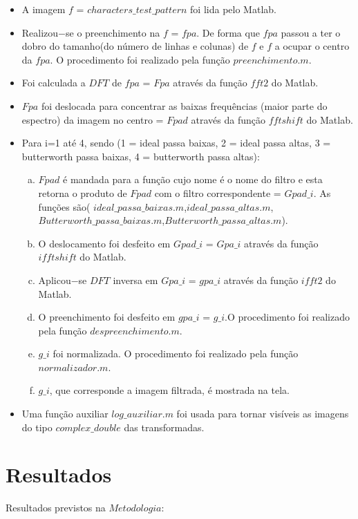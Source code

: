 \documentclass[conference]{IEEEtran}
\begin{document}
\begin{itemize}
	\item A imagem $f$ =  $characters\_test\_pattern$ foi lida pelo Matlab.
	\item Realizou$-$se o preenchimento na $f$ = $fpa$. De forma que $fpa$ passou a ter o dobro do tamanho(do n\'umero de linhas e colunas) de $f $ e $f$ a ocupar o centro da $fpa$. O procedimento foi realizado pela fun\c{c}\~ao $preenchimento.m$.
	\item Foi calculada a $DFT$ de $fpa$ = $Fpa$ atrav\'es da fun\c{c}\~ao $fft2$ do Matlab.
	\item $Fpa $ foi deslocada para concentrar as baixas frequ\^encias (maior parte do espectro) da imagem no centro = $Fpad$ atrav\'es da fun\c{c}\~ao $fftshift$ do Matlab. 
	\item Para i=1 at\'e 4, sendo (1 = ideal passa baixas, 2 = ideal passa altas, 3 = butterworth passa baixas, 4 = butterworth passa altas):
		\begin{enumerate}[(a)]
		\item $Fpad$ \'e mandada para a fun\c{c}\~ao cujo nome \'e o nome do filtro e esta retorna o produto de $Fpad$ com o filtro correspondente = $Gpad\_i$. As fun\c{c}\~oes s\~ao( $ideal\_passa\_baixas.m$,$ideal\_passa\_altas.m$,\\$Butterworth\_passa\_baixas.m$,$Butterworth\_passa\_altas.m$).
		\item O deslocamento foi desfeito em  $Gpad\_i$ = $Gpa\_i$ atrav\'es da fun\c{c}\~ao $ifftshift$ do Matlab.
		\item Aplicou$-$se $DFT$ inversa em $Gpa\_i$ = $gpa\_i$ atrav\'es da fun\c{c}\~ao $ifft2$ do Matlab.
		\item O preenchimento foi desfeito em  $gpa\_i$ = $g\_i$.O procedimento foi realizado pela fun\c{c}\~ao $despreenchimento.m$.
		\item $g\_i$ foi normalizada. O procedimento foi realizado pela fun\c{c}\~ao $normalizador.m$.
		\item $g\_i$, que corresponde a imagem filtrada, \'e mostrada na tela.
		\end{enumerate}
	\item Uma fun\c{c}\~ao auxiliar $log\_auxiliar.m$ foi usada para tornar vis\'iveis as imagens do tipo $complex\_double$ das transformadas.
\end{itemize}

\section{Resultados} 
\label{sec:meth} 
Resultados previstos na $Metodologia$:
\end{document}
